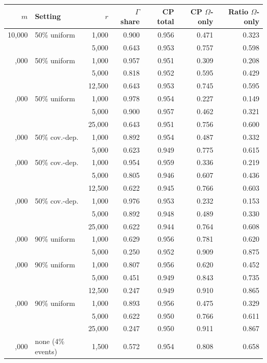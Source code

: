 \begin{tabular}{rlrrrrr}
\toprule
\(m\) & Setting & \(r\) & \(\Gamma\) share & CP total & CP \(\Omega\)-only & Ratio \(\Omega\)-only\\
\midrule
10,000 & 50\% uniform & 1,000 & 0.900 & 0.956 & 0.471 & 0.323\\
 &  & 5,000 & 0.643 & 0.953 & 0.757 & 0.598\\
\addlinespace
25,000 & 50\% uniform & 1,000 & 0.957 & 0.951 & 0.309 & 0.208\\
 &  & 5,000 & 0.818 & 0.952 & 0.595 & 0.429\\
 &  & 12,500 & 0.643 & 0.953 & 0.745 & 0.595\\
\addlinespace
50,000 & 50\% uniform & 1,000 & 0.978 & 0.954 & 0.227 & 0.149\\
 &  & 5,000 & 0.900 & 0.957 & 0.462 & 0.321\\
 &  & 25,000 & 0.643 & 0.951 & 0.756 & 0.600\\
\addlinespace
10,000 & 50\% cov.-dep. & 1,000 & 0.892 & 0.954 & 0.487 & 0.332\\
 &  & 5,000 & 0.623 & 0.949 & 0.775 & 0.615\\
\addlinespace
25,000 & 50\% cov.-dep. & 1,000 & 0.954 & 0.959 & 0.336 & 0.219\\
 &  & 5,000 & 0.805 & 0.946 & 0.607 & 0.436\\
 &  & 12,500 & 0.622 & 0.945 & 0.766 & 0.603\\
\addlinespace
50,000 & 50\% cov.-dep. & 1,000 & 0.976 & 0.953 & 0.232 & 0.153\\
 &  & 5,000 & 0.892 & 0.948 & 0.489 & 0.330\\
 &  & 25,000 & 0.622 & 0.944 & 0.764 & 0.608\\
\addlinespace
10,000 & 90\% uniform & 1,000 & 0.629 & 0.956 & 0.781 & 0.620\\
 &  & 5,000 & 0.250 & 0.952 & 0.909 & 0.875\\
\addlinespace
25,000 & 90\% uniform & 1,000 & 0.807 & 0.956 & 0.620 & 0.452\\
 &  & 5,000 & 0.451 & 0.949 & 0.843 & 0.735\\
 &  & 12,500 & 0.247 & 0.949 & 0.910 & 0.865\\
\addlinespace
50,000 & 90\% uniform & 1,000 & 0.893 & 0.956 & 0.475 & 0.329\\
 &  & 5,000 & 0.622 & 0.950 & 0.766 & 0.611\\
 &  & 25,000 & 0.247 & 0.950 & 0.911 & 0.867\\
\addlinespace
25,000 & none (4\% events) & 1,500 & 0.572 & 0.954 & 0.808 & 0.658\\

\end{tabular}
